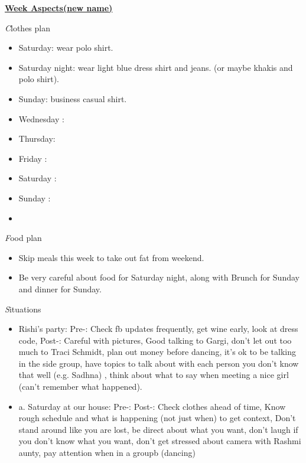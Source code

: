 \documentclass[serif,mathserif,final]{beamer}
\begin{document}
\begin{frame}{}
\begin{columns}[t]
\begin{column}{0.30\linewidth} {\textbf{\underline{Week Aspects(new name)}}}
  \begin{block}{\textit Clothes plan } 
    \begin{itemize} 
    \tiny \item \tiny Saturday: wear polo shirt. 
    \item \tiny Saturday night: wear light blue dress shirt and jeans. (or maybe khakis and polo shirt). 
    \item \tiny Sunday: business casual shirt. 
    \item \tiny Wednesday : 
    \item \tiny Thursday: 
    \item \tiny Friday : 
    \item \tiny Saturday : 
    \item \tiny Sunday : 
    \item \tiny   
    \end{itemize} 
  \end{block} 

  \begin{block}{\textit Food plan } 
    \begin{itemize} 
      \small \item \tiny Skip meals this week to take out fat from weekend. 
    \item \tiny Be very careful about food for Saturday night, along with Brunch for Sunday and dinner for Sunday. 
    \end{itemize} 
  \end{block} 

  \begin{block}{\textit Situations} 
    \begin{itemize} 
    \item \tiny  Rishi's party: Pre-: Check fb updates frequently, get wine early, look at dress code,  Post-: Careful with pictures, Good talking to Gargi, don't let out too much to Traci Schmidt, plan out money before dancing, it's ok to be talking in the side group, have topics to talk about with each person you don't know that well (e.g. Sadhna) , think about what to say when meeting a nice girl (can't remember what happened).

    \item \tiny
      a. Saturday at our house: Pre-:   Post-: Check clothes ahead of time, Know rough schedule and what is happening (not just when) to get context, Don't stand around like you are lost, be direct about what you want, don't laugh if you don't know what you want,  don't get stressed about camera with Rashmi aunty, pay attention when in a groupb (dancing) \\
      

\end{itemize}
\end{block}
\end{column}
\end{columns}
\end{frame}
\end{document}
